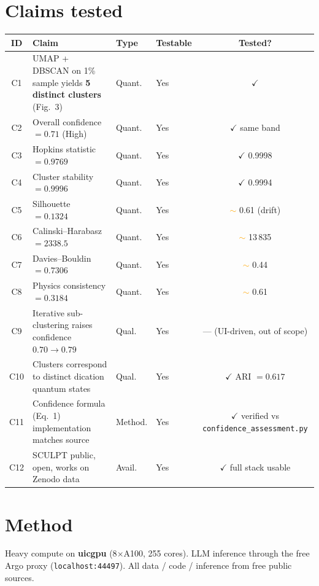 \documentclass[11pt]{article}
\begin{document}
\section{Claims tested}

\begin{table}[h!]
\centering\small
\begin{tabular}{@{}clllc@{}}
\toprule
ID & Claim & Type & Testable & Tested? \\
\midrule
C1 & UMAP + DBSCAN on 1\% sample yields \textbf{5 distinct clusters} (Fig.~3) & Quant. & Yes & \textcolor{green!60!black}{$\checkmark$} \\
C2 & Overall confidence $= 0.71$ (High) & Quant. & Yes & \textcolor{green!60!black}{$\checkmark$} same band \\
C3 & Hopkins statistic $= 0.9769$ & Quant. & Yes & \textcolor{green!60!black}{$\checkmark$} 0.9998 \\
C4 & Cluster stability $= 0.9996$ & Quant. & Yes & \textcolor{green!60!black}{$\checkmark$} 0.9994 \\
C5 & Silhouette $= 0.1324$ & Quant. & Yes & \textcolor{orange}{$\sim$} 0.61 (drift) \\
C6 & Calinski--Harabasz $= 2338.5$ & Quant. & Yes & \textcolor{orange}{$\sim$} 13\,835 \\
C7 & Davies--Bouldin $= 0.7306$ & Quant. & Yes & \textcolor{orange}{$\sim$} 0.44 \\
C8 & Physics consistency $= 0.3184$ & Quant. & Yes & \textcolor{orange}{$\sim$} 0.61 \\
C9 & Iterative sub-clustering raises confidence $0.70 \to 0.79$ & Qual. & Yes & --- (UI-driven, out of scope) \\
C10 & Clusters correspond to distinct dication quantum states & Qual. & Yes & \textcolor{green!60!black}{$\checkmark$} ARI $= 0.617$ \\
C11 & Confidence formula (Eq.~1) implementation matches source & Method. & Yes & \textcolor{green!60!black}{$\checkmark$} verified vs \texttt{confidence\_assessment.py} \\
C12 & SCULPT public, open, works on Zenodo data & Avail. & Yes & \textcolor{green!60!black}{$\checkmark$} full stack usable \\
\bottomrule
\end{tabular}
\end{table}

\section{Method}
Heavy compute on \textbf{uicgpu} (8$\times$A100, 255 cores). LLM inference through the free Argo proxy (\texttt{localhost:44497}). All data / code / inference from free public sources.
\end{document}
